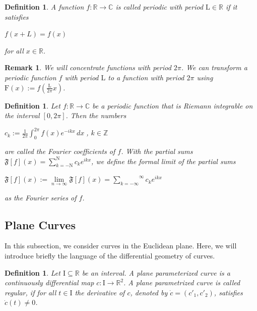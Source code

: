 \documentclass[a4paper]{book}
\newtheorem{remark}[theorem]{Remark}%
\newtheorem{definition}[theorem]{Definition}%
\numberwithin{theorem}{section}%
\begin{document}
\begin{definition}
    A function $f:\mathbb{R}\to\mathbb{C}$ is called \textit{periodic} with period $\mathrm{L}\in\mathbb{R}$ if it satisfies
    \begin{center}
        $f(x+L)=f(x)$
    \end{center}
    for all $x\in\mathbb{R}$.
\end{definition}

\begin{remark}
    We will concentrate functions with period $2\pi$. We can transform a periodic function $f$ with period $\mathrm{L}$ to a function with period $2\pi$ using $\displaystyle \mathrm{F}(x):=f(\frac{\mathrm{L}}{2\pi}x)$.
\end{remark}

\begin{definition}
    Let $f:\mathbb{R}\to\mathbb{C}$ be a periodic function that is Riemann integrable on the interval $[0,2\pi]$. Then the numbers
    \begin{center}
        $\displaystyle c_{k}:=\frac{1}{2\pi}\int_{0}^{2\pi}f(x)e^{-ikx}\,dx\;$, $k\in\mathbb{Z}$
    \end{center}
    are called the \textit{Fourier coefficients} of $f$. With the partial sums $\mathfrak{F}[f](x)=\sum_{k=-\mathrm{N}}^{\mathrm{N}}c_{k}e^{ikx}$, we define the formal limit of the partial sums
    \begin{center}
        $\displaystyle \mathfrak{F}[f](x):=\underset{n\to\infty}{\lim}\mathfrak{F}[f](x)=\overset{\infty}{\underset{k=-\infty}{\sum}}c_{k}e^{ikx}$
    \end{center}
    as the \textit{Fourier series} of $f$.
\end{definition}

\subsection{Plane Curves}
In this subsection, we consider curves in the Euclidean plane. Here, we will introduce briefly the language of the differential geometry of curves.

\begin{definition}
    Let $\mathrm{I}\subseteq\mathbb{R}$ be an interval. A \textit{plane parameterized curve} is a continuously differential map $c:\mathrm{I}\to\mathbb{R}^{2}$. A plane parametrized curve is called \textit{regular}, if for all $t\in\mathrm{I}$ the derivative of $c$, denoted by $\dot{c}=(c'_{1},c'_{2})$, satisfies $\dot{c}(t)\neq0$.
\end{definition} 
\end{document}
